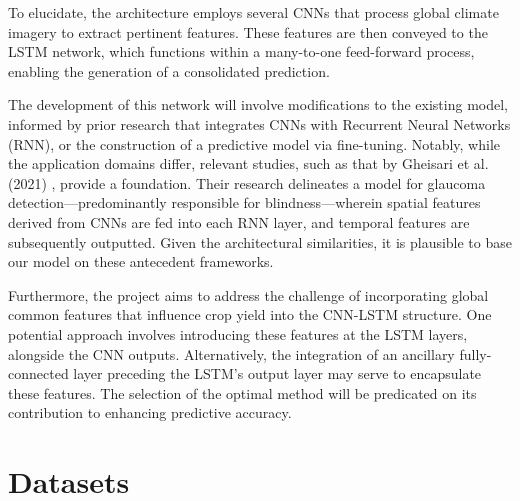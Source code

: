 \documentclass[11pt, oneside]{article}   	%
\begin{document}
To elucidate, the architecture employs several CNNs that process global climate imagery to extract pertinent features. These features are then conveyed to the LSTM network, which functions within a many-to-one feed-forward process, enabling the generation of a consolidated prediction.

The development of this network will involve modifications to the existing model, informed by prior research that integrates CNNs with Recurrent Neural Networks (RNN), or the construction of a predictive model via fine-tuning. Notably, while the application domains differ, relevant studies, such as that by Gheisari et al. (2021) \cite{citation_key2}, provide a foundation. Their research delineates a model for glaucoma detection—predominantly responsible for blindness—wherein spatial features derived from CNNs are fed into each RNN layer, and temporal features are subsequently outputted. Given the architectural similarities, it is plausible to base our model on these antecedent frameworks.

Furthermore, the project aims to address the challenge of incorporating global common features that influence crop yield into the CNN-LSTM structure. One potential approach involves introducing these features at the LSTM layers, alongside the CNN outputs. Alternatively, the integration of an ancillary fully-connected layer preceding the LSTM’s output layer may serve to encapsulate these features. The selection of the optimal method will be predicated on its contribution to enhancing predictive accuracy.

\section*{Datasets}
\end{document}
